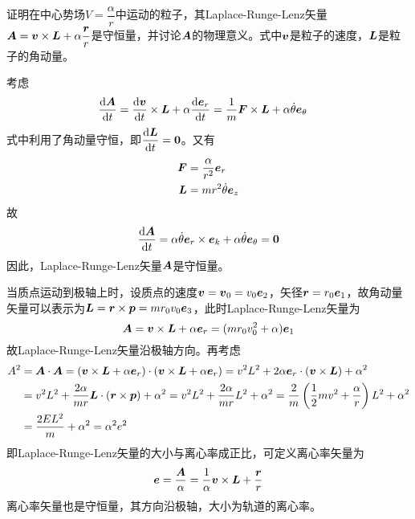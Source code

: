 \begin{question}[99页3.20]
证明在中心势场$V=\dfrac{\alpha}{r}$中运动的粒子，其Laplace-Runge-Lenz矢量$\boldsymbol{A} = \boldsymbol{v} \times \boldsymbol{L} + \alpha \dfrac{\boldsymbol{r}}{r}$是守恒量，并讨论$\boldsymbol{A}$的物理意义。式中$\boldsymbol{v}$是粒子的速度，$\boldsymbol{L}$是粒子的角动量。
\end{question}
\begin{solution}
考虑
\begin{align*}
	\frac{\mathrm{d} \boldsymbol{A}}{\mathrm{d} t} & = \frac{\mathrm{d} \boldsymbol{v}}{\mathrm{d} t} \times \boldsymbol{L} + \alpha \frac{\mathrm{d} \boldsymbol{e}_r}{\mathrm{d} t} = \frac{1}{m} \boldsymbol{F} \times \boldsymbol{L} + \alpha \dot{\theta} \boldsymbol{e}_\theta
\end{align*}
式中利用了角动量守恒，即$\dfrac{\mathrm{d} \boldsymbol{L}}{\mathrm{d} t} = \boldsymbol{0}$。又有
\begin{align*}
	\boldsymbol{F} & = \frac{\alpha}{r^2} \boldsymbol{e}_r \\
	\boldsymbol{L} & = mr^2 \dot{\theta} \boldsymbol{e}_z
\end{align*}
故
\begin{equation*}
	\frac{\mathrm{d} \boldsymbol{A}}{\mathrm{d} t} = \alpha \dot{\theta} \boldsymbol{e}_r \times \boldsymbol{e}_k + \alpha \dot{\theta} \boldsymbol{e}_\theta = \boldsymbol{0}
\end{equation*}
因此，Laplace-Runge-Lenz矢量$\boldsymbol{A}$是守恒量。

当质点运动到极轴上时，设质点的速度$\boldsymbol{v} = \boldsymbol{v}_0 = v_0 \boldsymbol{e}_2$，矢径$\boldsymbol{r} = r_0 \boldsymbol{e}_1$，故角动量矢量可以表示为$\boldsymbol{L} = \boldsymbol{r} \times \boldsymbol{p} = mr_0 v_0 \boldsymbol{e}_3$，此时Laplace-Runge-Lenz矢量为
\begin{equation*}
	\boldsymbol{A} = \boldsymbol{v} \times \boldsymbol{L} + \alpha \boldsymbol{e}_r = (mr_0 v_0^2 +\alpha)\boldsymbol{e}_1
\end{equation*}
故Laplace-Runge-Lenz矢量沿极轴方向。再考虑
\begin{align*}
	A^2 & = \boldsymbol{A} \cdot \boldsymbol{A} = \left(\boldsymbol{v} \times \boldsymbol{L} + \alpha \boldsymbol{e}_r\right) \cdot \left(\boldsymbol{v} \times \boldsymbol{L} + \alpha \boldsymbol{e}_r\right) = v^2 L^2 + 2\alpha \boldsymbol{e}_r \cdot (\boldsymbol{v} \times \boldsymbol{L}) + \alpha^2 \\
	& = v^2 L^2 + \frac{2\alpha}{mr} \boldsymbol{L} \cdot (\boldsymbol{r} \times \boldsymbol{p}) + \alpha^2 = v^2 L^2 + \frac{2\alpha}{mr} L^2 + \alpha^2 = \frac{2}{m}\left(\frac12 mv^2 + \frac{\alpha}{r}\right) L^2 + \alpha^2 \\
	& = \frac{2EL^2}{m} + \alpha^2 = \alpha^2 e^2
\end{align*}
即Laplace-Runge-Lenz矢量的大小与离心率成正比，可定义{\heiti 离心率矢量}为
\begin{equation*}
	\boldsymbol{e} = \frac{\boldsymbol{A}}{\alpha} = \frac{1}{\alpha} \boldsymbol{v} \times \boldsymbol{L} + \frac{\boldsymbol{r}}{r}
\end{equation*}
离心率矢量也是守恒量，其方向沿极轴，大小为轨道的离心率。
\end{solution}

